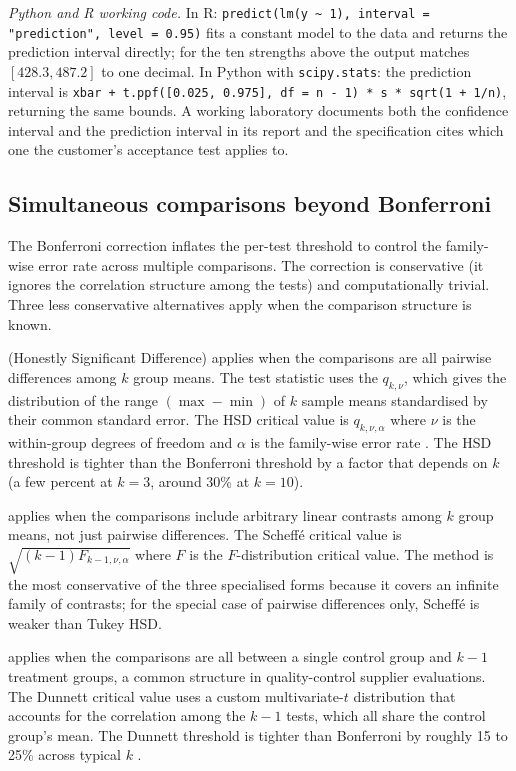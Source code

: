 \emph{Python and R working code.} In R: \texttt{predict(lm(y \textasciitilde\ 1),
interval = "prediction", level = 0.95)} fits a constant model to
the data and returns the prediction interval directly; for the ten
strengths above the output matches $[428.3, 487.2]$ to one decimal.
In Python with \texttt{scipy.stats}: the prediction interval is
\texttt{xbar + t.ppf([0.025, 0.975], df = n - 1) * s * sqrt(1 + 1/n)},
returning the same bounds. A working laboratory documents both the
confidence interval and the prediction interval in its report and
the specification cites which one the customer's acceptance test
applies to.

\subsection{Simultaneous comparisons beyond Bonferroni}

The Bonferroni correction inflates the per-test threshold to control
the family-wise error rate across multiple comparisons. The
correction is conservative (it ignores the correlation structure
among the tests) and computationally trivial. Three less conservative
alternatives apply when the comparison structure is known.

 (Honestly Significant Difference) applies when
the comparisons are all pairwise differences among $k$ group means.
The test statistic uses the 
$q_{k, \nu}$, which gives the distribution of the range
$(\max - \min)$ of $k$ sample means standardised by their common
standard error. The HSD critical value is $q_{k, \nu, \alpha}$
where $\nu$ is the within-group degrees of freedom and $\alpha$ is
the family-wise error rate \cite{text:ch04t3-montgomery-cir-2020}.
The HSD threshold is tighter than the Bonferroni threshold by a
factor that depends on $k$ (a few percent at $k = 3$, around 30\%
at $k = 10$).

 applies when the comparisons include
arbitrary linear contrasts among $k$ group means, not just pairwise
differences. The Scheff\'e critical value is
$\sqrt{(k-1) F_{k-1, \nu, \alpha}}$ where $F$ is the $F$-distribution
critical value. The method is the most conservative of the three
specialised forms because it covers an infinite family of contrasts;
for the special case of pairwise differences only, Scheff\'e is
weaker than Tukey HSD.

 applies when the comparisons are all
between a single control group and $k - 1$ treatment groups, a
common structure in quality-control supplier evaluations. The
Dunnett critical value uses a custom multivariate-$t$ distribution
that accounts for the correlation among the $k - 1$ tests, which
all share the control group's mean. The Dunnett threshold is
tighter than Bonferroni by roughly 15 to 25\% across typical $k$
\cite{text:ch04t3-montgomery-cir-2020}.

